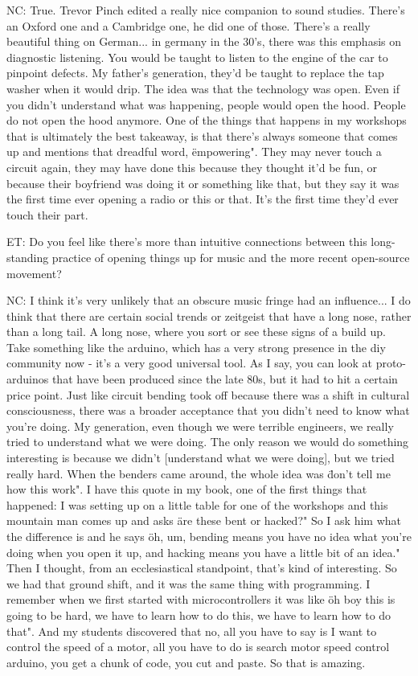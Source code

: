 NC: True. Trevor Pinch edited a really nice companion to sound studies. There's an Oxford one and a Cambridge one, he did one of those. There's a really beautiful thing on German... in germany in the 30's, there was this emphasis on diagnostic listening. You would be taught to listen to the engine of the car to pinpoint defects. My father's generation, they'd be taught to replace the tap washer when it would drip. The idea was that the technology was open. Even if you didn't understand what was happening, people would open the hood. People do not open the hood anymore. One of the things that happens in my workshops that is ultimately the best takeaway, is that there's always someone that comes up and mentions that dreadful word, \"empowering". They may never touch a circuit again, they may have done this because they thought it'd be fun, or because their boyfriend was doing it or something like that, but they say it was the first time ever opening a radio or this or that. It's the first time they'd ever touch their part. 

ET: Do you feel like there's more than intuitive connections between this long-standing practice of opening things up for music and the more recent open-source movement? 

NC: I think it's very unlikely that an obscure music fringe had an influence... I do think that there are certain social trends or zeitgeist that have a long nose, rather than a long tail. A long nose, where you sort or see these signs of a build up. Take something like the arduino, which has a very strong presence in the diy community now - it's a very good universal tool. As I say, you can look at proto-arduinos that have been produced since the late 80s, but it had to hit a certain price point. Just like circuit bending took off because there was a shift in cultural consciousness, there was a broader acceptance that you didn't need to know what you're doing. My generation, even though we were terrible engineers, we really tried to understand what we were doing. The only reason we would do something interesting is because we didn't [understand what we were doing], but we tried really hard. When the benders came around, the whole idea was \"don't tell me how this work". I have this quote in my book, one of the first things that happened: I was setting up on a little table for one of the workshops and this mountain man comes up and asks \"are these bent or hacked?" So I ask him what the difference is and he says \"oh, um, bending means you have no idea what you're doing when you open it up, and hacking means you have a little bit of an idea." Then I thought, from an ecclesiastical standpoint, that's kind of interesting. So we had that ground shift, and it was the same thing with programming. I remember when we first started with microcontrollers it was like \"oh boy this is going to be hard, we have to learn how to do this, we have to learn how to do that". And my students discovered that no, all you have to say is I want to control the speed of a motor, all you have to do is search motor speed control arduino, you get a chunk of code, you cut and paste. So that is amazing. 

